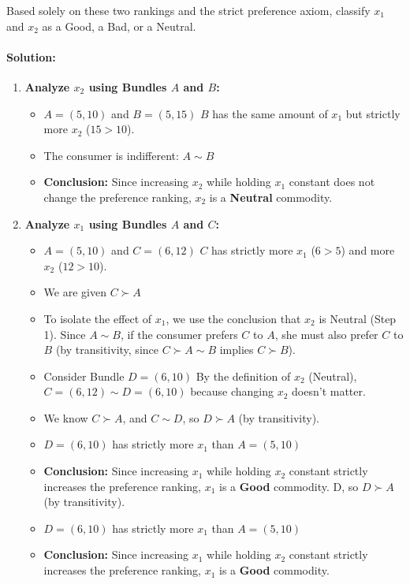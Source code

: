 \documentclass{article}
\begin{document}
Based solely on these two rankings and the strict preference axiom, classify $x_1$ and $x_2$ as a Good, a Bad, or a Neutral.

\paragraph*{Solution:}
\begin{enumerate}
    \item \textbf{Analyze $x_2$ using Bundles $A$ and $B$:}
    \begin{itemize}
        \item $A = (5, 10)$ and $B = (5, 15)$ $B$ has the same amount of $x_1$ but strictly more $x_2$ ($15 > 10$).
        \item The consumer is indifferent: $A \sim B$
        \item \textbf{Conclusion:} Since increasing $x_2$ while holding $x_1$ constant does not change the preference ranking, $x_2$ is a \textbf{Neutral} commodity.
    \end{itemize}
    \item \textbf{Analyze $x_1$ using Bundles $A$ and $C$:}
    \begin{itemize}
        \item $A = (5, 10)$ and $C = (6, 12)$ $C$ has strictly more $x_1$ ($6 > 5$) and more $x_2$ ($12 > 10$).
        \item We are given $C \succ A$
        \item To isolate the effect of $x_1$, we use the conclusion that $x_2$ is Neutral (Step 1). Since $A \sim B$, if the consumer prefers $C$ to $A$, she must also prefer $C$ to $B$ (by transitivity, since $C \succ A \sim B$ implies $C \succ B$).
        \item Consider Bundle $D = (6, 10)$ By the definition of $x_2$ (Neutral), $C = (6, 12) \sim D = (6, 10)$ because changing $x_2$ doesn't matter.
        \item We know $C \succ A$, and $C \sim D$, so $D \succ A$ (by transitivity).
        \item $D=(6, 10)$ has strictly more $x_1$ than $A=(5, 10)$
        \item \textbf{Conclusion:} Since increasing $x_1$ while holding $x_2$ constant strictly increases the preference ranking, $x_1$ is a \textbf{Good} commodity. D, so $D \succ A$ (by transitivity).
        \item $D=(6, 10)$ has strictly more $x_1$ than $A=(5, 10)$
        \item \textbf{Conclusion:} Since increasing $x_1$ while holding $x_2$ constant strictly increases the preference ranking, $x_1$ is a \textbf{Good} commodity.
    \end{itemize}
\end{enumerate}
\end{document}
